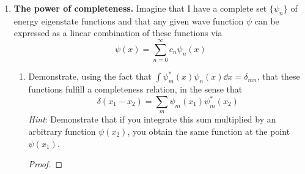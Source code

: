 \documentclass[../psets.tex]{subfiles}
\begin{document}
\begin{enumerate}
\begin{enumerate}
\begin{proof}
            We now discuss the implications of this result. In part (a), we proved that the $\ev{\hat{p}^n}{\psi}$ are fixed for all time, which means in particular that
            \begin{equation*}
                \sigma_p^2 = \ev{\hat{p}^2}{\psi}-(\ev{\hat{p}}{\psi})^2
            \end{equation*}
            is fixed. Thus, Eq. \ref{eqn:4.6} essentially implies that for sufficiently large time $t$, the uncertainty in the position of the free particle increases approximately linearly with time. We may visualize this as the particle "spreading out" as time passes, much like a wave function might expand after it collapses.\par
            The fact that the momentum is not well-defined is the \emph{reason} that the particle spreads out over time. Essentially, different "parts" of the particle will move with different momenta, so as the free particle "moves," some parts of it will move faster and some will move slower, causing it to spread out! This further justifies the linear relation, which in these terms essentially says that the greater the uncertainty in momenta, the greater the difference in speed of different parts of the particle, and the greater the spread in $x$ as time goes on.
        \end{proof}
    \end{enumerate}
    \pagebreak
    \item \textbf{The power of completeness.} Imagine that I have a complete set $\{\psi_n\}$ of energy eigenstate functions and that any given wave function $\psi$ can be expressed as a linear combination of these functions via
    \begin{equation}\label{eqn:4.7}
        \psi(x) = \sum_{n=0}^\infty c_n\psi_n(x)
    \end{equation}
    \begin{enumerate}
        \item Demonstrate, using the fact that $\int\psi_m^*(x)\psi_n(x)\dd{x}=\delta_{mn}$, that these functions fulfill a completeness relation, in the sense that
        \begin{equation}\label{eqn:4.8}
            \delta(x_1-x_2) = \sum_m\psi_m(x_1)\psi_m^*(x_2)
        \end{equation}
        \emph{Hint}: Demonstrate that if you integrate this sum multiplied by an arbitrary function $\psi(x_2)$, you obtain the same function at the point $\psi(x_1)$.
        \begin{proof}


\end{proof}
\end{enumerate}
\end{enumerate}
\end{document}
